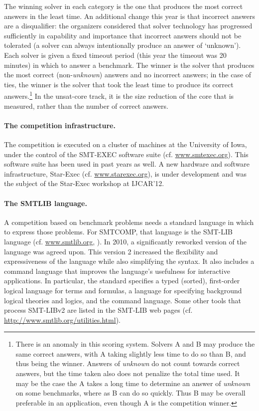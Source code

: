 \documentclass[twosize,11pt]{article}
\begin{document}
The winning solver in each category is the one that produces the most correct answers in the least time. An additional change this year is that incorrect answers are a disqualifier: the organizers considered that solver technology has progressed sufficiently in capability and importance that incorrect answers should not be tolerated (a solver can always intentionally produce an answer of `unknown'). Each solver is given a fixed timeout period (this year the timeout was 20 minutes) in which to answer a benchmark. The winner is the solver that produces the most correct (non-{\em unknown}) answers and no incorrect answers; in the case of ties, the winner is the solver that took the least time to produce its correct answers.\footnote{There is an anomaly in this scoring system. Solvers A and B may produce the same correct answers, with A taking slightly less time to do so than B, and thus being the winner. Answers of {\em unknown} do not count towards correct answers, but the time taken also does not penalize the total time used. It may be the case the A takes a long time to determine an answer of {\em unknown} on some benchmarks, where as B can do so quickly. Thus B may be overall preferable in an application, even though A is the competition winner.}
In the unsat-core track, it is the size reduction of the core that is measured, rather than the number of correct answers.

\paragraph{The competition infrastructure.} The competition is executed on a cluster of machines at the University of Iowa, under the control of the SMT-EXEC software suite (cf. \url{www.smtexec.org}). This software suite has been used in past years as well. A new hardware and software infrastructure, Star-Exec (cf. \url{www.starexec.org}), is under development and was the subject of the Star-Exec workshop at IJCAR'12.

\paragraph{The SMTLIB language.} A competition based on benchmark problems needs a standard language in which to express those problems.
For SMTCOMP, that language is the SMT-LIB language (cf. \url{www.smtlib.org}, \cite{BarST-SMT-10} \cite{Cok-SMTLIBTutorial-2011}). 
In 2010, a significantly reworked version of the language was agreed upon.
This version 2 increased the flexibility and expressiveness of the language while also simplifying the syntax. 
It also includes a command language that improves the language's usefulness for interactive applications.
In particular, the standard specifies a typed (sorted), first-order logical language for terms and formulas, a language for specifying background logical theories and logics, and the command language. Some other tools that process SMT-LIBv2 are listed in the SMT-LIB web pages (cf. \url{http://www.smtlib.org/utilities.html}).
\end{document}
